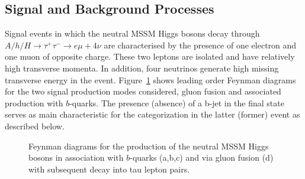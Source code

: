 \subsection{Signal and Background Processes}
Signal events in which the neutral MSSM Higgs bosons decay through 
$A/h/H \rightarrow \tau^+ \tau^- \rightarrow e \mu +4\nu$  are characterised 
by the presence of one electron and one muon of opposite charge. These two leptons are isolated and have 
relatively high transverse momenta. In addition, four neutrinos generate high missing transverse energy in the event. 
Figure~\ref{fig:feyndiagSignal} shows leading order Feynman diagrams for the two signal production modes considered,
gluon fusion and  associated production  with $b$-quarks.
The presence (absence) of a b-jet in the final state serves as  main characteristic for the categorization
in the latter (former) event as described below.

\begin{figure}[tp]
     \begin{center}
     \hspace{0.2cm}	
     	\hspace{0.2cm}	
     \end{center}
    \caption{Feynman diagrams for the production of the neutral MSSM Higgs bosons in association with  $b$-quarks (a,b,c) and via gluon fusion (d) 
	with subsequent decay into tau lepton pairs.}
   \label{fig:feyndiagSignal}
\end{figure}

